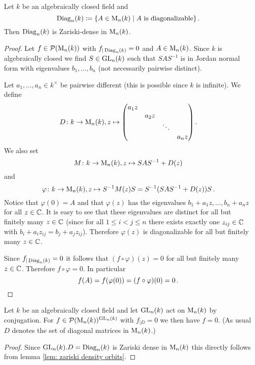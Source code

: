 \begin{prop}
  Let $k$ be an algebraically closed field and
  \[
              \operatorname{Diag}_n(k)
    \coloneqq \{
                A \in \operatorname{M}_n(k)
              \mid
                \text{$A$ is diagonalizable}
              \} \,.
  \]
  Then $\operatorname{Diag}_n(k)$ is Zariski-dense in $\operatorname{M}_n(k)$.
\end{prop}
\begin{proof}
  Let $f \in \mathcal{P}(\operatorname{M}_n(k))$ with $f_{|\operatorname{Diag}_n(k)} = 0$ and $A \in \operatorname{M}_n(k)$.
  Since $k$ is algebraically closed we find $S \in \operatorname{GL}_n(k)$ such that $SAS^{-1}$ is in Jordan normal form with eigenvalues $b_1, \dotsc, b_n$ (not necessarily pairwise distinct).
  
  Let $a_1, \dotsc, a_n \in k^\times$ be pairwise different (this is possible since $k$ is infinite).
  We define
  \[
            D
    \colon  k
    \to     \operatorname{M}_n(k), 
            z
    \mapsto \begin{pmatrix}
              a_1 z &       &        &       \\
                    & a_2 z &        &       \\
                    &       & \ddots &       \\
                    &       &        & a_n z
            \end{pmatrix}.
  \]
  We also set
  \[
            M
    \colon  k
    \to     \operatorname{M}_n(k),
            z
    \mapsto SAS^{-1} + D(z)
  \]
  and
  \[
            \varphi
    \colon  k
    \to     \operatorname{M}_n(k),
            z
    \mapsto S^{-1} M(z) S
    =       S^{-1}(SAS^{-1}+D(z))S \,.
  \]
  Notice that $\varphi(0) = A$ and that $\varphi(z)$ has the eigenvalues $b_1 + a_1 z, \dotsc, b_n + a_n z$ for all $z \in \mathbb{C}$.
  It is easy to see that these eigenvalues are distinct for all but finitely many $z \in \mathbb{C}$ (since for all $1 \leq i < j \leq n$ there exists exactly one $z_{ij} \in \mathbb{C}$ with $b_i + a_i z_{ij} = b_j + a_j z_{ij}$).
  Therefore $\varphi(z)$ is diagonalizable for all but finitely many $z \in \mathbb{C}$.
  
  Since $f_{|\operatorname{Diag}_n(k)} = 0$ it follows that $(f \circ \varphi)(z) = 0$ for all but finitely many $z \in \mathbb{C}$.
  Therefore $f \circ \varphi = 0$.
  In particular
  \[
      f(A)
    = f(\varphi(0))
    = (f \circ \varphi)(0)
    = 0 \,.
    \qedhere
  \]
\end{proof}


\begin{cor}\label{cor: diagonal matrices dense alg closed}
  Let $k$ be an algebraically closed field and let $\operatorname{GL}_n(k)$ act on $\operatorname{M}_n(k)$ by conjugation.
  For $f \in \mathcal{P}(\operatorname{M}_n(k))^{\operatorname{GL}_n(k)}$ with $f_{|D} = 0$ we then have $f = 0$.
  (As usual $D$ denotes the set of diagonal matrices in $\operatorname{M}_n(k)$.)
\end{cor}
\begin{proof}
  Since $\operatorname{GL}_n(k).D = \operatorname{Diag}_n(k)$ is Zariski dense in $\operatorname{M}_n(k)$ this directly follows from lemma \ref{lem: zariski density orbits}.
\end{proof}


